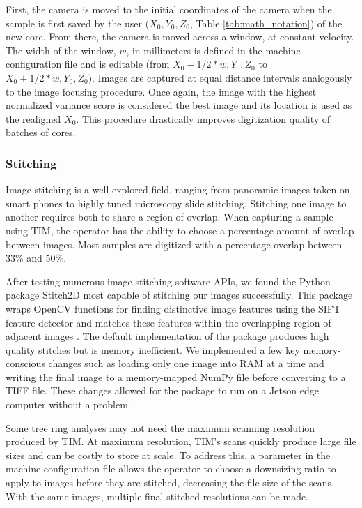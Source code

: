 \documentclass[a4paper,12pt]{article}
\begin{document}
First, the camera is moved to the initial coordinates of the camera when the sample is first saved by the user $(X_0, Y_0, Z_0$, Table \ref{tab:math_notation}) of the new core. 
From there, the camera is moved across a window, at constant velocity. %
The width of the window, $w$, in millimeters is defined in the machine configuration file and is editable %
(from $X_0 - 1/2*{w}, Y_0, Z_0$ to $X_0 + 1/2*{w}, Y_0, Z_0)$. 
Images are captured at equal distance intervals analogously to the image focusing procedure. 
Once again, the image with the highest normalized variance score is considered the best image and its location is used as the realigned $X_0$.
This procedure drastically improves digitization quality of batches of cores.

\subsubsection{Stitching}

Image stitching is a well explored field, ranging from panoramic images taken on smart phones to highly tuned microscopy slide stitching. 
Stitching one image to another requires both to share a region of overlap. When capturing a sample using TIM, the operator has the ability to choose a percentage amount of overlap between images.
Most samples are digitized with a percentage overlap between 33\% and 50\%.

After testing numerous image stitching software APIs, we found the Python package Stitch2D most capable of stitching our images successfully. %
This package wraps OpenCV functions for finding distinctive image features using the SIFT feature detector and matches these features within the overlapping region of adjacent images \citep{lowe_distinctive_2004}. 
The default implementation of the package produces high quality stitches but is memory inefficient. %
We implemented a few key memory-conscious changes such as loading only one image into RAM at a time and writing the final image to a memory-mapped NumPy file before converting to a TIFF file. These changes allowed for the package to run on a Jetson edge computer without a problem.

Some tree ring analyses may not need the maximum scanning resolution produced by TIM. At maximum resolution, TIM's scans quickly produce large file sizes and can be costly to store at scale. 
To address this, a parameter in the machine configuration file allows the operator to choose a downsizing ratio to apply to images before they are stitched, decreasing the file size of the scans.
With the same images, multiple final stitched resolutions can be made. 
\end{document}
